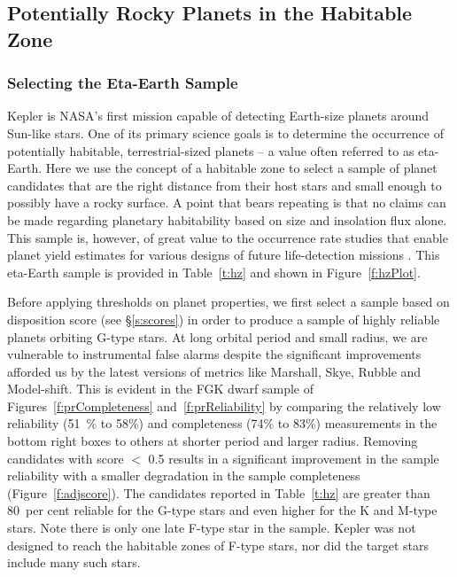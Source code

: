 \label{s:hz}
\subsection{Potentially Rocky Planets in the Habitable Zone}

\subsubsection{Selecting the Eta-Earth Sample}
Kepler is NASA's first mission capable of detecting Earth-size planets around Sun-like stars.  One of its primary science goals is to determine the occurrence of potentially habitable, terrestrial-sized planets -- a value often referred to as eta-Earth.  Here we use the concept of a habitable zone to select a sample of planet candidates that are the right distance from their host stars and small enough to possibly have a rocky surface. A point that bears repeating is that no claims can be made regarding planetary habitability based on size and insolation flux alone.   This sample is, however, of great value to the occurrence rate studies that enable planet yield estimates for various designs of future life-detection missions \citep{stark2015}. This eta-Earth sample is provided in Table~\ref{t:hz} and shown in Figure~\ref{f:hzPlot}.


Before applying thresholds on planet properties, we first select a sample based on disposition score (see \S\ref{s:scores}) in order to produce a sample of highly reliable planets orbiting G-type stars. At long orbital period and small radius, we are vulnerable to instrumental false alarms despite the significant improvements afforded us by the latest versions of metrics like Marshall, Skye, Rubble and Model-shift. This is evident in the FGK dwarf sample of Figures~\ref{f:prCompleteness} and~\ref{f:prReliability} by comparing the relatively low reliability (51~\% to 58\%) and completeness (74\% to 83\%) measurements in the bottom right boxes to others at shorter period and larger radius.  Removing candidates with score $<$ 0.5 results in a significant improvement in the sample reliability with a smaller degradation in the sample completeness (Figure~\ref{f:adjscore}).  The candidates reported in Table~\ref{t:hz} are greater than 80~per cent reliable for the G-type stars and even higher for the K and M-type stars. Note there is only one late F-type star in the sample.  Kepler was not designed to reach the habitable zones of F-type stars, nor did the target stars include many such stars.


